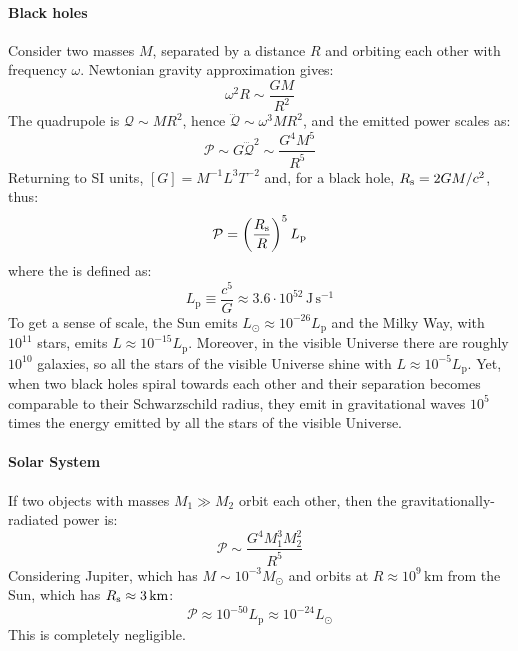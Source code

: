 \paragraph{Black holes}

Consider two masses $ M $, separated by a distance $ R $ and orbiting each other with frequency $ \omega $. Newtonian gravity approximation gives:
\begin{equation*}
  \omega^2 R \sim \frac{GM}{R^2}
\end{equation*}
The quadrupole is $ \mathcal{Q} \sim M R^2 $, hence $ \dddot{\mathcal{Q}} \sim \omega^3 M R^2 $, and the emitted power scales as:
\begin{equation*}
  \mathcal{P} \sim G \dddot{\mathcal{Q}}^2 \sim \frac{G^4 M^5}{R^5}
\end{equation*}
Returning to SI units, $ [G] = M^{-1} L^3 T^{-2} $ and, for a black hole, $ R_\text{s} = 2GM / c^2 $, thus:
\begin{equation*}
  \mathcal{P} = \left( \frac{R_\text{s}}{R} \right)^5 L_{\text{p}}
\end{equation*}
where the  is defined as:
\begin{equation*}
  L_{\text{p}} \equiv \frac{c^5}{G} \approx 3.6 \cdot 10^{52} \,\text{J}\,\text{s}^{-1}
\end{equation*}
To get a sense of scale, the Sun emits $ L_{\odot} \approx 10^{-26} L_{\text{p}} $ and the Milky Way, with $ 10^{11} $ stars, emits $ L \approx 10^{-15} L_{\text{p}} $. Moreover, in the visible Universe there are roughly $ 10^{10} $ galaxies, so all the stars of the visible Universe shine with $ L \approx 10^{-5} L_{\text{p}} $. Yet, when two black holes spiral towards each other and their separation becomes comparable to their Schwarzschild radius, they emit in gravitational waves $ 10^5 $ times the energy emitted by all the stars of the visible Universe.

\paragraph{Solar System}

If two objects with masses $ M_1 \gg M_2 $ orbit each other, then the gravitationally-radiated power is:
\begin{equation*}
  \mathcal{P} \sim \frac{G^4 M_1^3 M_2^2}{R^5}
\end{equation*}
Considering Jupiter, which has $ M \sim 10^{-3} M_{\odot} $ and orbits at $ R \approx 10^9\,\text{km} $ from the Sun, which has $ R_\text{s} \approx 3\,\text{km} $:
\begin{equation*}
  \mathcal{P} \approx 10^{-50} L_{\text{p}} \approx 10^{-24} L_{\odot}
\end{equation*}
This is completely negligible.

